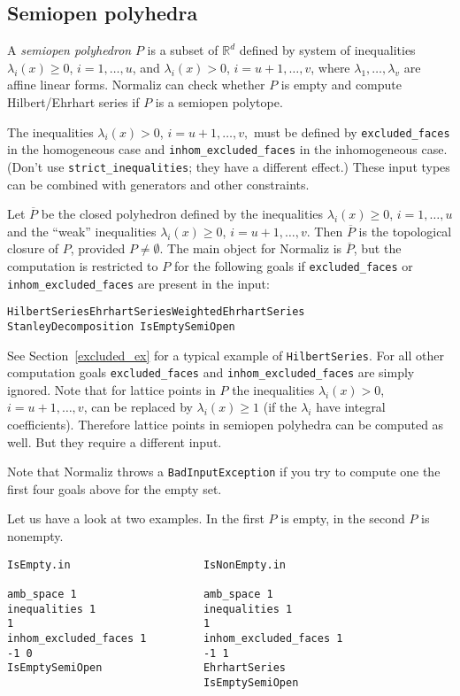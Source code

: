 \documentclass[12pt,a4paper]{scrartcl}
\theoremstyle{definition}
\def\RR{{\mathbb R}}
\begin{document}
\subsection{Semiopen polyhedra}\label{semi_open}

A \emph{semiopen polyhedron} $P$ is a subset of $\RR^d$ defined by system of inequalities $\lambda_i(x)\ge 0$, $i=1,\dots,u$, and $\lambda_i(x)> 0$, $i=u+1,\dots,v$, where $\lambda_1,\dots,\lambda_v$ are affine linear forms. Normaliz can check whether $P$ is empty and compute Hilbert/Ehrhart series if $P$ is a semiopen polytope.

The inequalities $\lambda_i(x)> 0$, $i=u+1,\dots,v,$ must be defined by \verb|excluded_faces| in the homogeneous case and \verb|inhom_excluded_faces| in the inhomogeneous case. (Don't use \verb|strict_inequalities|; they have a different effect.) These input types can be combined with generators and other constraints.

Let $\overline P$ be the closed polyhedron defined by the inequalities $\lambda_i(x)\ge 0$, $i=1,\dots,u$ and the ``weak'' inequalities $\lambda_i(x)\ge 0$, $i=u+1,\dots,v$. Then $\overline P$ is the topological closure of $P$, provided $P\neq\emptyset$. The main object for Normaliz is $\overline P$, but the computation is restricted to $P$ for the following goals if \verb|excluded_faces| or \verb|inhom_excluded_faces| are present in the input:
\begin{center}
	\texttt{HilbertSeries\quad EhrhartSeries\quad WeightedEhrhartSeries\\ StanleyDecomposition \quad IsEmptySemiOpen}
\end{center}
See Section~\ref{excluded_ex} for a typical example of \verb|HilbertSeries|. For all other computation goals \verb|excluded_faces| and \verb|inhom_excluded_faces| are simply ignored. Note that for lattice points in $P$ the inequalities $\lambda_i(x)> 0$, $i=u+1,\dots,v$, can be replaced by $\lambda_i(x)\ge 1$ (if the $\lambda_i$ have integral coefficients). Therefore lattice points in semiopen polyhedra can be computed as well. But they require a different input.

Note that Normaliz throws a \verb|BadInputException| if you try to compute one the first four goals above for the empty set.

Let us have a look at two examples. In the first $P$ is empty, in the second $P$ is nonempty.
\begin{Verbatim}
IsEmpty.in                     IsNonEmpty.in

amb_space 1                    amb_space 1
inequalities 1                 inequalities 1
1                              1
inhom_excluded_faces 1         inhom_excluded_faces 1
-1 0                           -1 1
IsEmptySemiOpen                EhrhartSeries
                               IsEmptySemiOpen
\end{Verbatim}
\end{document}
